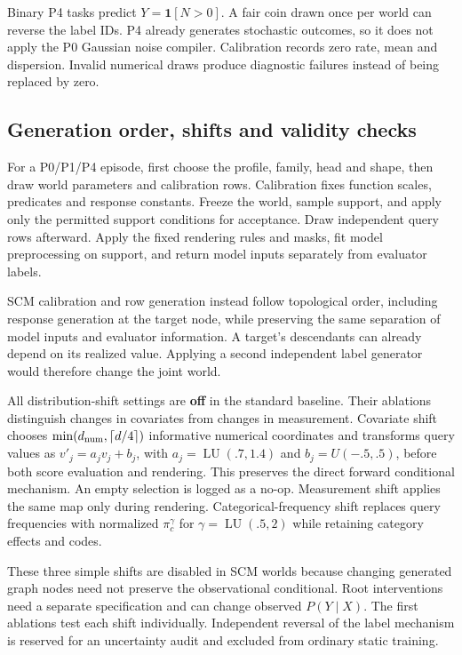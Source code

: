 \documentclass[11pt]{article}
\begin{document}
Binary P4 tasks predict $Y=\mathbf1[N>0]$. A fair coin drawn once per world can reverse the label IDs. P4 already generates stochastic outcomes, so it does not apply the P0 Gaussian noise compiler. Calibration records zero rate, mean and dispersion. Invalid numerical draws produce diagnostic failures instead of being replaced by zero.

\subsection{Generation order, shifts and validity checks}

For a P0/P1/P4 episode, first choose the profile, family, head and shape, then draw world parameters and calibration rows. Calibration fixes function scales, predicates and response constants. Freeze the world, sample support, and apply only the permitted support conditions for acceptance. Draw independent query rows afterward. Apply the fixed rendering rules and masks, fit model preprocessing on support, and return model inputs separately from evaluator labels.

SCM calibration and row generation instead follow topological order, including response generation at the target node, while preserving the same separation of model inputs and evaluator information. A target's descendants can already depend on its realized value. Applying a second independent label generator would therefore change the joint world.

All distribution-shift settings are \textbf{off} in the standard baseline. Their ablations distinguish changes in covariates from changes in measurement. Covariate shift chooses $\min(d_{\rm num},\lceil d/4\rceil)$ informative numerical coordinates and transforms query values as $v'_j=a_jv_j+b_j$, with $a_j=\operatorname{LU}(.7,1.4)$ and $b_j=U(-.5,.5)$, before both score evaluation and rendering. This preserves the direct forward conditional mechanism. An empty selection is logged as a no-op. Measurement shift applies the same map only during rendering. Categorical-frequency shift replaces query frequencies with normalized $\pi_c^{\gamma}$ for $\gamma=\operatorname{LU}(.5,2)$ while retaining category effects and codes.

These three simple shifts are disabled in SCM worlds because changing generated graph nodes need not preserve the observational conditional. Root interventions need a separate specification and can change observed $P(Y\mid X)$. The first ablations test each shift individually. Independent reversal of the label mechanism is reserved for an uncertainty audit and excluded from ordinary static training.
\end{document}
